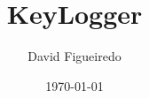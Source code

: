 \documentclass[a4paper,12pt]{article}
\begin{document}
	\title{KeyLogger}
	\author{David Figueiredo}
	\date{\today}
	\maketitle
\end{document}
